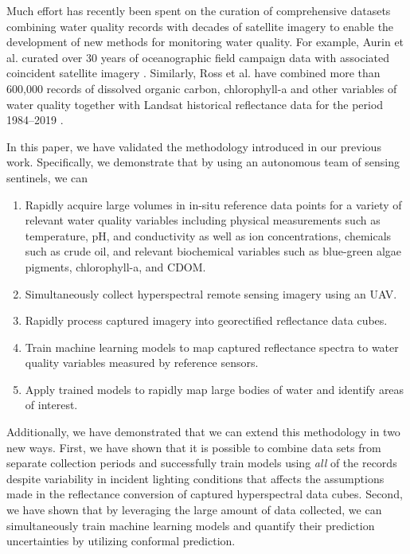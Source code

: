 \documentclass[remotesensing,article,submit,pdftex,moreauthors]{Definitions/mdpi}
\begin{document}
Much effort has recently been spent on the curation of comprehensive datasets combining water quality records with decades of satellite imagery to enable the development of new methods for monitoring water quality. For example, Aurin et al. curated over 30 years of oceanographic field campaign data with associated coincident satellite imagery \cite{aurin2018remote}. Similarly, Ross et al. have combined more than 600,000 records of dissolved organic carbon, chlorophyll-a and other variables of water quality together with Landsat historical reflectance data for the period 1984--2019 \cite{ross2019aquasat}. 


In this paper, we have validated the methodology introduced in our previous work\cite{robotTeam1}. Specifically, we demonstrate that by using an autonomous team of sensing sentinels, we can
\begin{enumerate}
    \item Rapidly acquire large volumes in in-situ reference data points for a variety of relevant water quality variables including physical measurements such as temperature, pH, and conductivity as well as ion concentrations, chemicals such as crude oil, and relevant biochemical variables such as blue-green algae pigments, chlorophyll-a, and CDOM. 
    \item Simultaneously collect hyperspectral remote sensing imagery using an UAV.
    \item Rapidly process captured imagery into georectified reflectance data cubes.
    \item Train machine learning models to map captured reflectance spectra to water quality variables measured by reference sensors.
    \item Apply trained models to rapidly map large bodies of water and identify areas of interest.
\end{enumerate}
Additionally, we have demonstrated that we can extend this methodology in two new ways. First, we have shown that it is possible to combine data sets from separate collection periods and successfully train models using \textit{all} of the records despite variability in incident lighting conditions that affects the assumptions made in the reflectance conversion of captured hyperspectral data cubes. Second, we have shown that by leveraging the large amount of data collected, we can simultaneously train machine learning models and quantify their prediction uncertainties by utilizing conformal prediction. 
\end{document}
